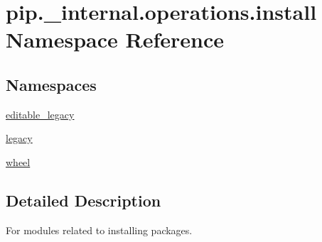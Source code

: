 \hypertarget{namespacepip_1_1__internal_1_1operations_1_1install}{}\section{pip.\+\_\+internal.\+operations.\+install Namespace Reference}
\label{namespacepip_1_1__internal_1_1operations_1_1install}
\subsection*{Namespaces}
\begin{DoxyCompactItemize}
\item 
 \hyperlink{namespacepip_1_1__internal_1_1operations_1_1install_1_1editable__legacy}{editable\+\_\+legacy}
\item 
 \hyperlink{namespacepip_1_1__internal_1_1operations_1_1install_1_1legacy}{legacy}
\item 
 \hyperlink{namespacepip_1_1__internal_1_1operations_1_1install_1_1wheel}{wheel}
\end{DoxyCompactItemize}


\subsection{Detailed Description}
\begin{DoxyVerb}For modules related to installing packages.
\end{DoxyVerb}
 